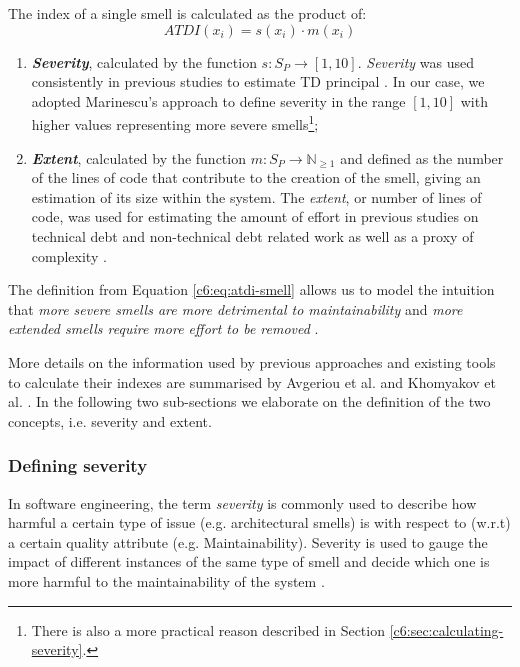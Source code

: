 The index of a single smell is calculated as the product of: 
\begin{equation}\label{c6:eq:atdi-smell}
    ATDI(x_i) = s(x_i) \cdot m(x_i)
\end{equation}
\begin{enumerate}[label=\alph*)]
    \item \textbf{\emph{Severity}}, calculated by the function $s : S_P \rightarrow  [1, 10]$. \emph{Severity} was used consistently in previous studies to estimate TD principal \cite{Roveda2018,Marinescu2012,Curtis2012}. In our case, we adopted Marinescu's \cite{Marinescu2012} approach to define severity in the range $[1, 10]$ with higher values representing more severe smells\footnote{There is also a more practical reason described in Section \ref{c6:sec:calculating-severity}.};
    \item \textbf{\emph{Extent}}, calculated by the function $m : S_P \rightarrow  \mathbb{N}_{\ge 1}$ and defined as the number of the lines of code that contribute to the creation of the smell, giving an estimation of its size within the system. The \emph{extent}, or number of lines of code, was used for estimating the amount of effort in previous studies on technical debt \cite{Chatzigeorgiou2015,Kamei2016,Nugroho2011} and non-technical debt related work as well as a proxy of complexity \cite{Morasca2001, Kitchenham2004}. 
\end{enumerate}

The definition from Equation \ref{c6:eq:atdi-smell} allows us to model the intuition that \emph{more severe smells are more detrimental to maintainability} \cite{Roveda2018} and \emph{more extended smells require more effort to be removed} \cite{Nugroho2011}. 

More details on the information used by previous approaches and existing tools to calculate their indexes are summarised by Avgeriou et al. and Khomyakov et al. \cite{Avgeriou2021,Khomyakov2020}.
In the following two sub-sections we elaborate on the definition of the two concepts, i.e. severity and extent.

\subsubsection{Defining severity}\label{c6:sec:approach-definition-severity}
In software engineering, the term \emph{severity} is commonly used to describe how harmful a certain type of issue (e.g. architectural smells) is with respect to (w.r.t) a certain quality attribute (e.g. Maintainability).
Severity is used to gauge the impact of different instances of the same type of smell and decide which one is more harmful to the maintainability of the system \cite{Marinescu2012}.

